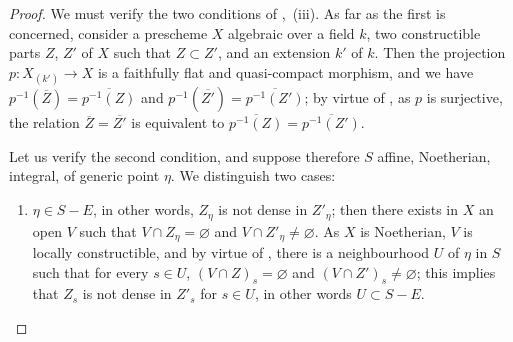 \begin{proof}
We must verify the two conditions of ,~(iii).
As far as the first is concerned, consider a prescheme $X$ algebraic over a field $k$, two constructible parts $Z$, $Z'$ of $X$ such that $Z\subset Z'$, and an extension $k'$ of $k$.
Then the projection $p:X_{(k')}\to X$ is a faithfully flat and quasi-compact morphism, and we have $p^{-1}(\overline{Z})=\overline{p^{-1}(Z)}$ and $p^{-1}(\overline{Z'})=\overline{p^{-1}(Z')}$; by virtue of , as $p$ is surjective, the relation $\overline{Z}=\overline{Z'}$ is equivalent to $\overline{p^{-1}(Z)}=\overline{p^{-1}(Z')}$.

Let us verify the second condition, and suppose therefore $S$ affine, Noetherian, integral, of generic point $\eta$.
We distinguish two cases:
\begin{enumerate}[label=\upshape{$\arabic{enumi}^\circ$}]
  \item $\eta\in S-E$, in other words, $Z_\eta$ is not dense in $Z'_\eta$; then there exists in $X$ an open $V$ such that $V\cap Z_\eta=\varnothing$ and $V\cap Z'_\eta\neq\varnothing$.
  As $X$ is Noetherian, $V$ is locally constructible, and by virtue of , there is a neighbourhood $U$ of $\eta$ in $S$ such that for every $s\in U$, $(V\cap Z)_s=\varnothing$ and $(V\cap Z')_s\neq\varnothing$; this implies that $Z_s$ is not dense in $Z'_s$ for $s\in U$, in other words $U\subset S-E$.



\end{enumerate}
\end{proof}
